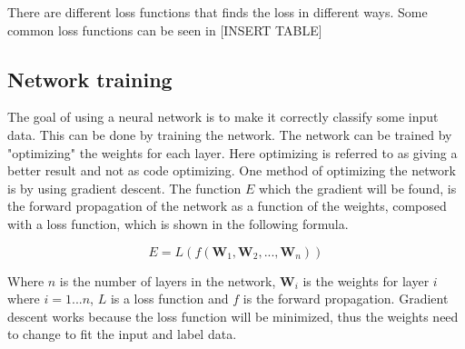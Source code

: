 There are different loss functions that finds the loss in different ways. Some common loss functions can be seen in [INSERT TABLE]

\subsection{Network training}

The goal of using a neural network is to make it correctly classify some input data. This can be done by training the network.
The network can be trained by "optimizing" the weights for each layer. Here optimizing is referred to as giving a better result and not as code optimizing.
One method of optimizing the network is by using gradient descent.
The function $E$ which the gradient will be found, is the forward propagation of the network as a function of the weights, composed with a loss function, which is shown in the following formula.

$$E = L(f(\bm{W}_1, \bm{W}_2, ..., \bm{W}_n))$$

Where $n$ is the number of layers in the network, $\bm{W}_i$ is the weights for layer $i$ where $i = 1...n$, $L$ is a loss function and $f$ is the forward propagation.
Gradient descent works because the loss function will be minimized, thus the weights need to change to fit the input and label data.


